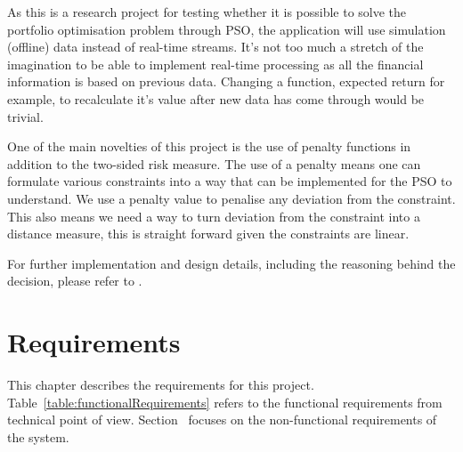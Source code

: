 \documentclass{pdfmx4020}
\begin{document}
  As this is a research project for testing whether it is possible to solve the portfolio optimisation problem through PSO, the application will use simulation (offline) data instead of real-time streams. It's not too much a stretch of the imagination to be able to implement real-time processing as all the financial information is based on previous data. Changing a function, expected return for example, to recalculate it's value after new data has come through would be trivial. 

  One of the main novelties of this project is the use of penalty functions in addition to the two-sided risk measure. The use of a penalty means one can formulate various constraints into a way that can be implemented for the PSO to understand. We use a penalty value to penalise any deviation from the constraint. This also means we need a way to turn deviation from the constraint into a distance measure, this is straight forward given the constraints are linear. 

  For further implementation and design details, including the reasoning behind the decision, please refer to .


\chapter{Requirements}
This chapter describes the requirements for this project. Table~\ref{table:functionalRequirements} refers to the functional requirements from technical point of view. Section~ focuses on the non-functional requirements of the system.
\end{document}
